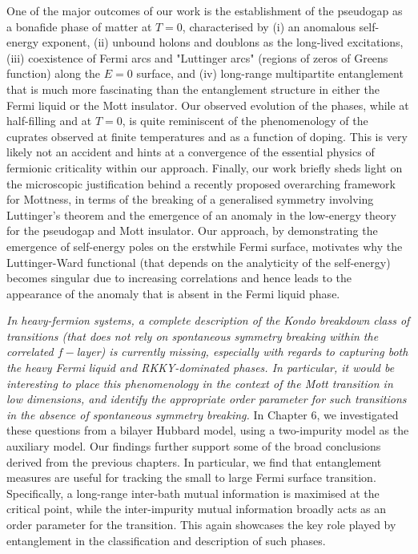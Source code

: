 One of the major outcomes of our work is the establishment of the pseudogap as a bonafide phase of matter at \(T=0\), characterised by (i) an anomalous self-energy exponent, (ii) unbound holons and doublons as the long-lived excitations, (iii) coexistence of Fermi arcs and "Luttinger arcs" (regions of zeros of Greens function) along the \(E=0\) surface, and (iv) long-range multipartite entanglement that is much more fascinating than the entanglement structure in either the Fermi liquid or the Mott insulator. Our observed evolution of the phases, while at half-filling and at \(T=0\), is quite reminiscent of the phenomenology of the cuprates observed at finite temperatures and as a function of doping. This is very likely not an accident and hints at a convergence of the essential physics of fermionic criticality within our approach. Finally, our work briefly sheds light on the microscopic justification behind a recently proposed overarching framework for Mottness, in terms of the breaking of a generalised symmetry involving Luttinger's theorem and the emergence of an anomaly in the low-energy theory for the pseudogap and Mott insulator. Our approach, by demonstrating the emergence of self-energy poles on the erstwhile Fermi surface, motivates why the Luttinger-Ward functional (that depends on the analyticity of the self-energy) becomes singular due to increasing correlations and hence leads to the appearance of the anomaly that is absent in the Fermi liquid phase.

{\it In heavy-fermion systems, a complete description of the Kondo breakdown class of transitions (that does not rely on spontaneous symmetry breaking within the correlated \(f-\)layer) is currently missing, especially with regards to capturing both the heavy Fermi liquid and RKKY-dominated phases. In particular, it would be interesting to place this phenomenology in the context of the Mott transition in low dimensions, and identify the appropriate order parameter for such transitions in the absence of spontaneous symmetry breaking.} In Chapter 6, we investigated these questions from a bilayer Hubbard model, using a two-impurity model as the auxiliary model. Our findings further support some of the broad conclusions derived from the previous chapters. In particular, we find that entanglement measures are useful for tracking the small to large Fermi surface transition. Specifically, a long-range inter-bath mutual information is maximised at the critical point, while the inter-impurity mutual information broadly acts as an order parameter for the transition. This again showcases the key role played by entanglement in the classification and description of such phases.

